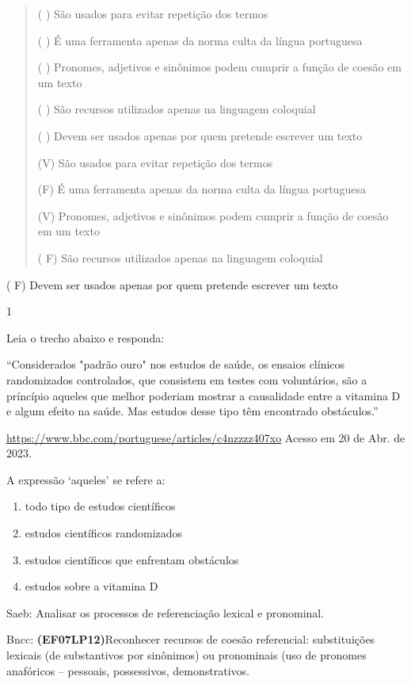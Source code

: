 {{\begin{quote}
( ) São usados para evitar repetição dos termos

( ) É uma ferramenta apenas da norma culta da língua portuguesa

( ) Pronomes, adjetivos e sinônimos podem cumprir a função de coesão em
um texto

( ) São recursos utilizados apenas na linguagem coloquial

( ) Devem ser usados apenas por quem pretende escrever um texto

(V) São usados para evitar repetição dos termos

(F) É uma ferramenta apenas da norma culta da língua portuguesa

(V) Pronomes, adjetivos e sinônimos podem cumprir a função de coesão em
um texto

( F) São recursos utilizados apenas na linguagem coloquial
\end{quote}

( F) Devem ser usados apenas por quem pretende escrever um texto


\num{1}

Leia o trecho abaixo e responda:

``Considerados "padrão ouro" nos estudos de saúde, os ensaios clínicos
randomizados controlados, que consistem em testes com voluntários, são a
príncípio aqueles que melhor poderiam mostrar a causalidade entre a
vitamina D e algum efeito na saúde. Mas estudos desse tipo têm
encontrado obstáculos.''

\href{https://www.bbc.com/portuguese/articles/c4nzzzz407xo}{\uline{https://www.bbc.com/portuguese/articles/c4nzzzz407xo}}
Acesso em 20 de Abr. de 2023.

A expressão `aqueles' se refere a:

\begin{enumerate}
\def\labelenumi{\alph{enumi})}
\item
  todo tipo de estudos científicos
\item
  estudos científicos randomizados
\item
  estudos científicos que enfrentam obstáculos
\item
  estudos sobre a vitamina D
\end{enumerate}

Saeb: Analisar os processos de referenciação lexical e pronominal.

Bncc: \textbf{(EF07LP12)}Reconhecer recursos de coesão referencial:
substituições lexicais (de substantivos por sinônimos) ou pronominais
(uso de pronomes anafóricos -- pessoais, possessivos, demonstrativos.

}}
